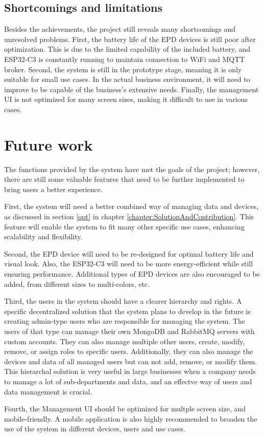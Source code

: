 \documentclass[../Main.tex]{subfiles}
\begin{document}
\subsection{Shortcomings and limitations}
Besides the achievements, the project still reveals many shortcomings and unresolved problems. First, the battery life of the EPD devices is still poor after optimization. This is due to the limited capability of the included battery, and ESP32-C3 is constantly running to maintain connection to WiFi and MQTT broker. Second, the system is still in the prototype stage, meaning it is only suitable for small use cases. In the actual business environment, it will need to improve to be capable of the business's extensive needs. Finally, the management UI is not optimized for many screen sizes, making it difficult to use in various cases.

\section{Future work}
The functions provided by the system have met the goals of the project; however, there are still some valuable features that need to be further implemented to bring users a better experience.

First, the system will need a better combined way of managing data and devices, as discussed in section \ref{opt} in chapter \ref{chapter:SolutionAndContribution}. This feature will enable the system to fit many other specific use cases, enhancing scalability and flexibility. 

Second, the EPD device will need to be re-designed for optimal battery life and visual look. Also, the ESP32-C3 will need to be more energy-efficient while still ensuring performance. Additional types of EPD devices are also encouraged to be added, from different sizes to multi-colors, etc. 

Third, the users in the system should have a clearer hierarchy and rights. A specific decentralized solution that the system plans to develop in the future is creating admin-type users who are responsible for managing the system. The users of that type can manage their own MongoDB and RabbitMQ servers with custom accounts. They can also manage multiple other users, create, modify, remove, or assign roles to specific users. Additionally, they can also manage the devices and data of all managed users but can not add, remove, or modify them. This hierarchal solution is very useful in large businesses when a company needs to manage a lot of sub-departments and data, and an effectve way of users and data management is crucial.

Fourth, the Management UI should be optimized for multple screen size, and mobile-friendly. A mobile application is also highly recommended to broaden the use of the system in different devices, users and use cases.
\end{document}
